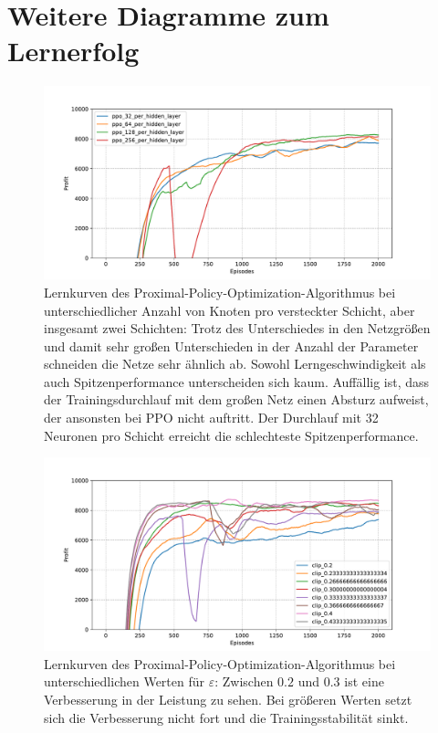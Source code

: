 \section{Weitere Diagramme zum Lernerfolg}
\begin{figure}[htbp]
	\centering
	\includegraphics[width=\textwidth]{appendix/ppo_different_networks.pdf}
	\caption{
		Lernkurven des Proximal-Policy-Optimization-Algorithmus bei unterschiedlicher Anzahl von Knoten pro versteckter Schicht, aber insgesamt zwei Schichten:
        Trotz des Unterschiedes in den Netzgrößen und damit sehr großen Unterschieden in der Anzahl der Parameter schneiden die Netze sehr ähnlich ab.
        Sowohl Lerngeschwindigkeit als auch Spitzenperformance unterscheiden sich kaum.
        Auffällig ist, dass der Trainingsdurchlauf mit dem großen Netz einen Absturz aufweist, der ansonsten bei PPO nicht auftritt.
        Der Durchlauf mit 32 Neuronen pro Schicht erreicht die schlechteste Spitzenperformance.
	}
	\label{graphic:PPODifferentNetworks}
\end{figure}
\begin{figure}[htbp]
	\centering
	\includegraphics[width=\textwidth]{appendix/ppo_different_clipping.pdf}
	\caption{
		Lernkurven des Proximal-Policy-Optimization-Algorithmus bei unterschiedlichen Werten für $\varepsilon$:
		Zwischen $0.2$ und $0.3$ ist eine Verbesserung in der Leistung zu sehen.
		Bei größeren Werten setzt sich die Verbesserung nicht fort und die Trainingsstabilität sinkt.
	}
	\label{graphic:PPODifferentClipping}
\end{figure}
